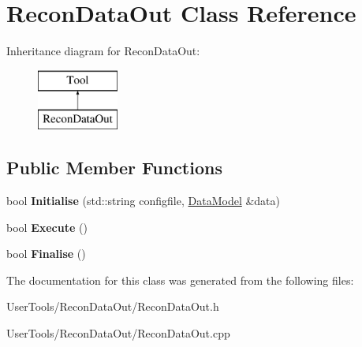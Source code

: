 \hypertarget{classReconDataOut}{\section{Recon\-Data\-Out Class Reference}
\label{classReconDataOut}
}
Inheritance diagram for Recon\-Data\-Out\-:\begin{figure}[H]
\begin{center}
\leavevmode
\includegraphics[height=2.000000cm]{classReconDataOut}
\end{center}
\end{figure}
\subsection*{Public Member Functions}
\begin{DoxyCompactItemize}
\item 
\hypertarget{classReconDataOut_ae03522cbdf98cd524240adbfe3eb93c1}{bool {\bfseries Initialise} (std\-::string configfile, \hyperlink{classDataModel}{Data\-Model} \&data)}\label{classReconDataOut_ae03522cbdf98cd524240adbfe3eb93c1}

\item 
\hypertarget{classReconDataOut_a1977f763aac394aba4099f45e4d567b0}{bool {\bfseries Execute} ()}\label{classReconDataOut_a1977f763aac394aba4099f45e4d567b0}

\item 
\hypertarget{classReconDataOut_a0b00ffbbabc530228b32aa26eab859f6}{bool {\bfseries Finalise} ()}\label{classReconDataOut_a0b00ffbbabc530228b32aa26eab859f6}

\end{DoxyCompactItemize}


The documentation for this class was generated from the following files\-:\begin{DoxyCompactItemize}
\item 
User\-Tools/\-Recon\-Data\-Out/Recon\-Data\-Out.\-h\item 
User\-Tools/\-Recon\-Data\-Out/Recon\-Data\-Out.\-cpp\end{DoxyCompactItemize}
